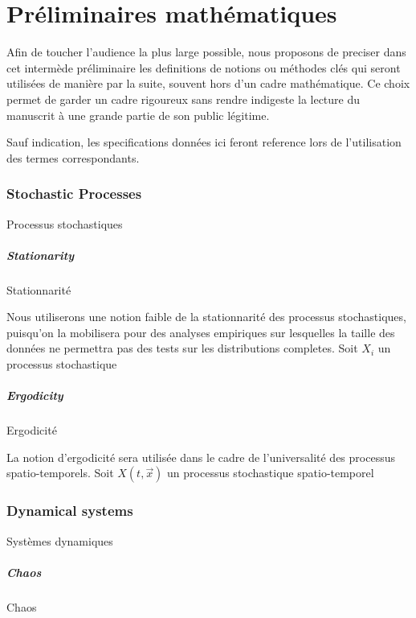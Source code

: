 

\chapter*{Préliminaires mathématiques}


Afin de toucher l'audience la plus large possible, nous proposons de preciser dans cet intermède préliminaire les definitions de notions ou méthodes clés qui seront utilisées de manière par la suite, souvent hors d'un cadre mathématique. Ce choix permet de garder un cadre rigoureux sans rendre indigeste la lecture du manuscrit à une grande partie de son public légitime.


Sauf indication, les specifications données ici feront reference lors de l'utilisation des termes correspondants.



\subsection*{Stochastic Processes}{Processus stochastiques}

\paragraph{Stationarity}{Stationnarité}

Nous utiliserons une notion faible de la stationnarité des processus stochastiques, puisqu'on la mobilisera pour des analyses empiriques sur lesquelles la taille des données ne permettra pas des tests sur les distributions completes. Soit $X_i$ un processus stochastique


\paragraph{Ergodicity}{Ergodicité}

La notion d'ergodicité sera utilisée dans le cadre de l'universalité des processus spatio-temporels. Soit $X(t,\vec{x})$ un processus stochastique spatio-temporel



\subsection*{Dynamical systems}{Systèmes dynamiques}

\paragraph{Chaos}{Chaos}



